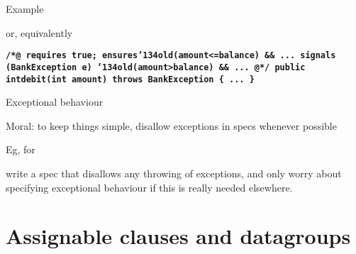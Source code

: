 \documentclass[
pdf,
nocolorBG,
slideColor,
erik,
]{prosper}
\newcommand{\code}[1]{{\rm \texttt{\textbf{\small #1}}}}
\newcommand{\old}     {\(\backslash\)old}
\newcommand{\bsl}{\char'134}
\renewcommand{\old}{\bsl old}
\begin{document}
\begin{slide}{Example}
\vspace*{-4ex}

or, equivalently

\begin{alltt}\code{\scriptsize{\green /*@} requires true;
     ensures{\red \old(amount<=balance)} && ...
     signals (BankException e)  
            {\red \old(amount>balance)} && ...
{\green   @*/}
  public int{\green debit}(int amount) throws BankException 
  \{ ...  \}
}
\end{alltt}


\end{slide}



\begin{slide}{Exceptional behaviour}
\vspace*{-4ex}

Moral: to keep things simple, disallow exceptions
in specs whenever possible

\bigskip

{\footnotesize
Eg, for


write a spec that disallows any throwing of exceptions, and only
worry about specifying exceptional behaviour if this is really needed
elsewhere.}

\end{slide}

\part{{\Large \red Assignable clauses and datagroups }}
\end{document}
